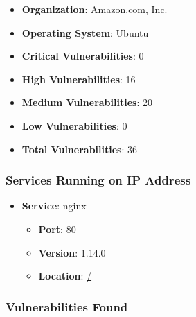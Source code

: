 \documentclass{article}
\begin{document}
\begin{itemize}
    \item \textbf{Organization}: Amazon.com, Inc.
    \item \textbf{Operating System}:  Ubuntu 
    \item \textbf{Critical Vulnerabilities}: 0
    \item \textbf{High Vulnerabilities}: 16
    \item \textbf{Medium Vulnerabilities}: 20
    \item \textbf{Low Vulnerabilities}: 0
    \item \textbf{Total Vulnerabilities}: 36
\end{itemize}

\subsubsection*{Services Running on IP Address}

\begin{itemize}
    
        \item \textbf{Service}: nginx
        \begin{itemize}
            \item \textbf{Port}: 80
            \item \textbf{Version}:  1.14.0 
            \item \textbf{Location}: \href{ / }{ / }
        \end{itemize}
    
\end{itemize}


\subsubsection*{Vulnerabilities Found}
\end{document}
